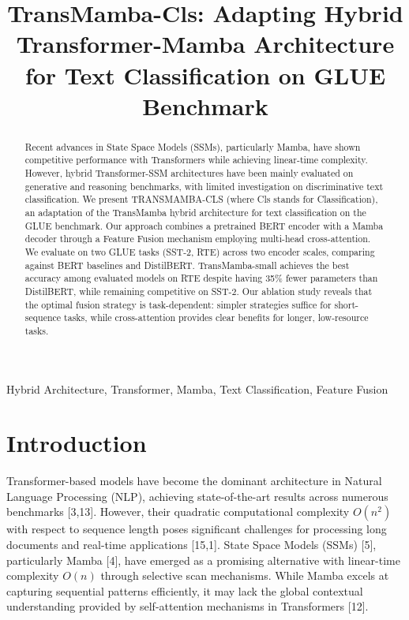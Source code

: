 \documentclass[10pt, conference]{IEEEtran}
\title{TransMamba-Cls: Adapting Hybrid Transformer-Mamba Architecture for Text Classification on GLUE Benchmark} %
\author{
\IEEEauthorblockN{Anonymous Author(s)} %
\IEEEauthorblockA{\textit{Affiliation anonymized for review}} %
}
\begin{document}
\maketitle

\begin{abstract}
Recent advances in State Space Models (SSMs), particularly Mamba, have shown competitive performance with Transformers while achieving linear-time complexity. %
However, hybrid Transformer-SSM architectures have been mainly evaluated on generative and reasoning benchmarks, with limited investigation on discriminative text classification. %
We present TRANSMAMBA-CLS (where Cls stands for Classification), an adaptation of the TransMamba hybrid architecture for text classification on the GLUE benchmark. %
Our approach combines a pretrained BERT encoder with a Mamba decoder through a Feature Fusion mechanism employing multi-head cross-attention. %
We evaluate on two GLUE tasks (SST-2, RTE) across two encoder scales, comparing against BERT baselines and DistilBERT. %
TransMamba-small achieves the best accuracy among evaluated models on RTE despite having 35\% fewer parameters than DistilBERT, while remaining competitive on SST-2. %
Our ablation study reveals that the optimal fusion strategy is task-dependent: simpler strategies suffice for short-sequence tasks, while cross-attention provides clear benefits for longer, low-resource tasks. %
\end{abstract}

\begin{IEEEkeywords}
Hybrid Architecture, Transformer, Mamba, Text Classification, Feature Fusion %
\end{IEEEkeywords}

\section{Introduction} %
Transformer-based models have become the dominant architecture in Natural Language Processing (NLP), achieving state-of-the-art results across numerous benchmarks [3,13]. %
However, their quadratic computational complexity $O(n^{2})$ with respect to sequence length poses significant challenges for processing long documents and real-time applications [15,1]. %
State Space Models (SSMs) [5], particularly Mamba [4], have emerged as a promising alternative with linear-time complexity $O(n)$ through selective scan mechanisms. %
While Mamba excels at capturing sequential patterns efficiently, it may lack the global contextual understanding provided by self-attention mechanisms in Transformers [12]. %
\end{document}
